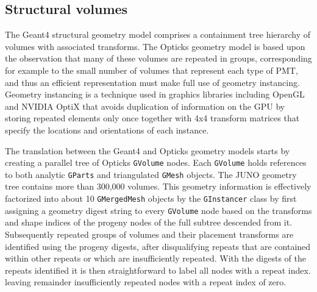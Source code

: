 \documentclass{webofc}
\begin{document}
%
%
%
\subsection{Structural volumes}%
%
The Geant4 structural geometry model comprises a containment tree hierarchy of volumes with associated transforms.
The Opticks geometry model is based upon the observation that many of these volumes are 
repeated in groups, corresponding for example to the small number of volumes that represent each type of PMT, 
and thus an efficient representation must make full use of geometry instancing. 
Geometry instancing is a technique used in graphics libraries including OpenGL and NVIDIA OptiX that 
avoids duplication of information on the GPU by storing repeated elements only once together 
with 4x4 transform matrices that specify the locations and orientations of each instance.

The translation between the Geant4 and Opticks geometry models starts by creating 
a parallel tree of Opticks {\tt GVolume} nodes. Each {\tt GVolume} holds references to both 
analytic {\tt GParts} and triangulated {\tt GMesh} objects.
The JUNO geometry tree contains more than 300,000 volumes.  This geometry information 
is effectively factorized into about 10 {\tt GMergedMesh} objects by the {\tt GInstancer} class
by first assigning a geometry digest string to every {\tt GVolume} node based on the transforms and shape 
indices of the progeny nodes of the full subtree descended from it. 
Subsequently repeated groups of volumes and their placement transforms are identified using the progeny digests, 
after disqualifying repeats that are contained within other repeats or which are insufficiently repeated.
With the digests of the repeats identified it is then straightforward to label all nodes with a repeat index.
leaving remainder insufficiently repeated nodes with a repeat index of zero.
\end{document}
